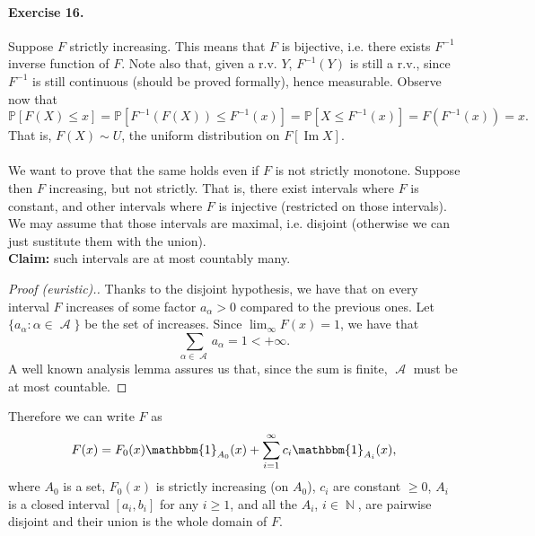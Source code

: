 \documentclass[12pt,a4paper]{report}
\theoremstyle{definition}
\theoremstyle{num.custom-title}
\DeclareMathOperator{\A}{\mathcal{A}}
\DeclareMathOperator{\N}{\mathbb{N}}
\renewcommand{\P}{\mathbb{P}}
\renewcommand{\1}{\mathbbm{1}}
\renewcommand{\Im}{\operatorname{Im}}
\begin{document}
\paragraph{Exercise 16.} Suppose $F$ strictly increasing. This means that $F$ is bijective, i.e. there exists $F^{-1}$ inverse function of $F$. Note also that, given a r.v. $Y$, $F^{-1}(Y)$ is still a r.v., since $F^{-1}$ is still continuous (should be proved formally), hence measurable. Observe now that 
\[
\P[F(X) \leq x] = \P[F^{-1}(F(X)) \leq F^{-1}(x)] = \P[X \leq F^{-1}(x)] = F(F^{-1}(x)) = x.
\]
That is, $F(X) \sim U$, the uniform distribution on $F[\Im X]$.\\
\\
We want to prove that the same holds even if $F$ is not strictly monotone. Suppose then $F$ increasing, but not strictly. That is, there exist intervals where $F$ is constant, and other intervals where $F$ is injective (restricted on those intervals). We may assume that those intervals are maximal, i.e. disjoint (otherwise we can just sustitute them with the union).\\
\textbf{Claim:} such intervals are at most countably many.
\begin{proof}[Proof (euristic).]
Thanks to the disjoint hypothesis, we have that on every interval $F$ increases of some factor $a_\alpha>0$ compared to the previous ones. Let $\{a_\alpha : \alpha \in \A\}$ be the set of increases. Since $\lim_\infty F(x) = 1$, we have that 
\[
\sum_{\alpha \in \A} a_\alpha = 1 < +\infty.
\]
A well known analysis lemma assures us that, since the sum is finite, $\A$ must be at most countable.
\end{proof}
Therefore we can write $F$ as 
\[
F(x)=F_0(x) \1_{A_0}(x) + \sum_{i=1}^\infty c_i \1_{A_i}(x),
\]
where $A_0$ is a set, $F_0(x)$ is strictly increasing (on $A_0$), $c_i$ are constant $\geq 0$, $A_i$ is a closed interval $[a_i,b_i]$ for any $i \geq 1$, and all the $A_i$, $i \in \N$, are pairwise disjoint and their union is the whole domain of $F$.
\end{document}
